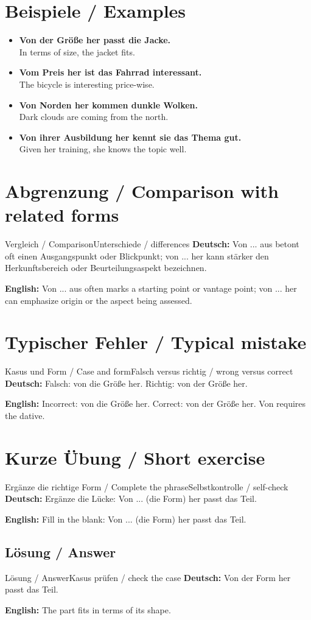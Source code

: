 \documentclass[a4paper,11pt]{article}
\newcommand{\GermanText}[1]{\textbf{Deutsch: }#1\par}
\newcommand{\EnglishText}[1]{{\small\color{SoftGray}\textbf{English: }#1\par}}
\newcommand{\ExampleItem}[2]{\item \textbf{#1}\\{\small\color{SoftGray}#2}}
\begin{document}
\section{Beispiele / Examples}
\begin{exbox}
\begin{itemize}
\ExampleItem{Von der Größe her passt die Jacke.}{In terms of size, the jacket fits.}
\ExampleItem{Vom Preis her ist das Fahrrad interessant.}{The bicycle is interesting price-wise.}
\ExampleItem{Von Norden her kommen dunkle Wolken.}{Dark clouds are coming from the north.}
\ExampleItem{Von ihrer Ausbildung her kennt sie das Thema gut.}{Given her training, she knows the topic well.}
\end{itemize}
\end{exbox}
\section{Abgrenzung / Comparison with related forms}
\begin{grammarentry}{Vergleich / Comparison}{Unterschiede / differences}
\GermanText{Von ... aus betont oft einen Ausgangspunkt oder Blickpunkt; von ... her kann stärker den Herkunftsbereich oder Beurteilungsaspekt bezeichnen.}
\EnglishText{Von ... aus often marks a starting point or vantage point; von ... her can emphasize origin or the aspect being assessed.}
\end{grammarentry}
\section{Typischer Fehler / Typical mistake}
\begin{grammarentry}{Kasus und Form / Case and form}{Falsch versus richtig / wrong versus correct}
\GermanText{Falsch: von die Größe her. Richtig: von der Größe her.}
\EnglishText{Incorrect: von die Größe her. Correct: von der Größe her. Von requires the dative.}
\end{grammarentry}
\section{Kurze Übung / Short exercise}
\begin{grammarentry}{Ergänze die richtige Form / Complete the phrase}{Selbstkontrolle / self-check}
\GermanText{Ergänze die Lücke: Von ... (die Form) her passt das Teil.}
\EnglishText{Fill in the blank: Von ... (die Form) her passt das Teil.}
\end{grammarentry}
\subsection{Lösung / Answer}
\begin{grammarentry}{Lösung / Answer}{Kasus prüfen / check the case}
\GermanText{Von der Form her passt das Teil.}
\EnglishText{The part fits in terms of its shape.}
\end{grammarentry}
\end{document}

